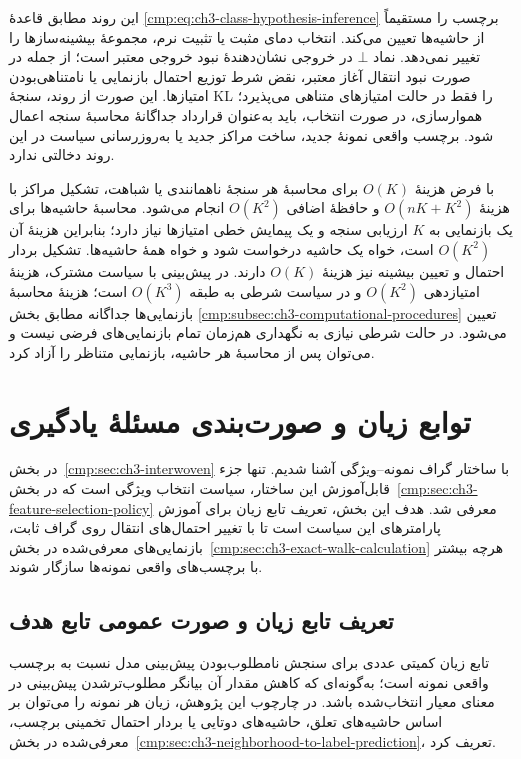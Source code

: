 این روند مطابق قاعدهٔ
\eqref{cmp:eq:ch3-class-hypothesis-inference} برچسب را
مستقیماً از حاشیه‌ها تعیین می‌کند. انتخاب دمای مثبت
یا تثبیت نرم، مجموعهٔ بیشینه‌سازها را تغییر نمی‌دهد.
نماد $\bot$ در خروجی نشان‌دهندهٔ نبود خروجی معتبر
است؛ از جمله در صورت نبود انتقال آغاز معتبر، نقض
شرط توزیع احتمال بازنمایی یا نامتناهی‌بودن امتیازها.
این صورت از روند، سنجهٔ KL را فقط در حالت امتیازهای
متناهی می‌پذیرد؛ هموارسازی، در صورت انتخاب، باید
به‌عنوان قرارداد جداگانهٔ محاسبهٔ سنجه اعمال شود.
برچسب واقعی نمونهٔ جدید، ساخت مراکز جدید یا
به‌روزرسانی سیاست در این روند دخالتی ندارد.

با فرض هزینهٔ $O(K)$ برای محاسبهٔ هر سنجهٔ
ناهمانندی یا شباهت، تشکیل مراکز با هزینهٔ
$O(nK+K^2)$ و حافظهٔ اضافی $O(K^2)$ انجام می‌شود.
محاسبهٔ حاشیه‌ها برای یک بازنمایی به $K$ ارزیابی
سنجه و یک پیمایش خطی امتیازها نیاز دارد؛ بنابراین
هزینهٔ آن $O(K^2)$ است، خواه یک حاشیه درخواست
شود و خواه همهٔ حاشیه‌ها. تشکیل بردار احتمال و
تعیین بیشینه نیز هزینهٔ $O(K)$ دارند. در پیش‌بینی
با سیاست مشترک، هزینهٔ امتیازدهی $O(K^2)$ و در
سیاست شرطی به طبقه $O(K^3)$ است؛ هزینهٔ محاسبهٔ
بازنمایی‌ها جداگانه مطابق بخش
\ref{cmp:subsec:ch3-computational-procedures} تعیین
می‌شود. در حالت شرطی نیازی به نگهداری هم‌زمان
تمام بازنمایی‌های فرضی نیست و می‌توان پس از
محاسبهٔ هر حاشیه، بازنمایی متناظر را آزاد کرد.

\section{توابع زیان و صورت‌بندی مسئلهٔ یادگیری}
\label{cmp:sec:ch3-training-losses}

در بخش~\ref{cmp:sec:ch3-interwoven} با ساختار گراف
نمونه--ویژگی آشنا شدیم. تنها جزء قابل‌آموزش این ساختار،
سیاست انتخاب ویژگی است که در
بخش~\ref{cmp:sec:ch3-feature-selection-policy} معرفی شد.
هدف این بخش، تعریف تابع زیان برای آموزش پارامترهای این
سیاست است تا با تغییر احتمال‌های انتقال روی گراف ثابت،
بازنمایی‌های معرفی‌شده در بخش~\ref{cmp:sec:ch3-exact-walk-calculation}
هرچه بیشتر با برچسب‌های واقعی نمونه‌ها سازگار شوند.

\subsection{تعریف تابع زیان و صورت عمومی تابع هدف}
\label{cmp:subsec:ch3-training-loss-contract}

تابع زیان کمیتی عددی برای سنجش نامطلوب‌بودن
پیش‌بینی مدل نسبت به برچسب واقعی نمونه است؛
به‌گونه‌ای که کاهش مقدار آن بیانگر مطلوب‌ترشدن
پیش‌بینی در معنای معیار انتخاب‌شده باشد.
در چارچوب این پژوهش، زیان هر نمونه را می‌توان
بر اساس حاشیه‌های تعلق، حاشیه‌های دوتایی یا
بردار احتمال تخمینی برچسب، معرفی‌شده در
بخش~\ref{cmp:sec:ch3-neighborhood-to-label-prediction}،
تعریف کرد.


